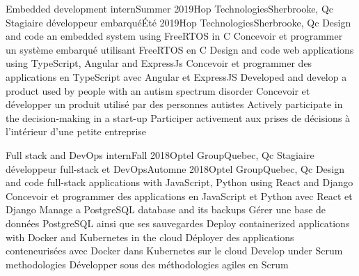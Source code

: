     \resumeSubheadingEnFr
      {Embedded development intern}{Summer 2019}{Hop Technologies}{Sherbrooke, Qc}
      {Stagiaire développeur embarqué}{Été 2019}{Hop Technologies}{Sherbrooke, Qc}
            \resumeItemListStart
                \resumeItemEnFr
                    {Design and code an embedded system using FreeRTOS in C}
                    {Concevoir et programmer un système embarqué utilisant FreeRTOS en C}
                \resumeItemEnFr
                    {Design and code web applications using TypeScript, Angular and ExpressJs}
                    {Concevoir et programmer des applications en TypeScript avec Angular et ExpressJS}
                \resumeItemEnFr
                    {Developed and develop a product used by people with an autism spectrum disorder}
                    {Concevoir et développer un produit utilisé par des personnes autistes}
                \resumeItemEnFr
                    {Actively participate in the decision-making in a start-up}
                    {Participer activement aux prises de décisions à l’intérieur d’une petite entreprise}
            \resumeItemListEnd

    \resumeSubheadingEnFr
      {Full stack and DevOps intern}{Fall 2018}{Optel Group}{Quebec, Qc}
      {Stagiaire développeur full-stack et DevOps}{Automne 2018}{Optel Group}{Quebec, Qc}
            \resumeItemListStart
                \resumeItemEnFr
                    {Design and code full-stack applications with JavaScript, Python using React and Django}
                    {Concevoir et programmer des applications en JavaScript et Python avec React et Django}
                \resumeItemEnFr
                    {Manage a PostgreSQL database and its backups}
                    {Gérer une base de données PostgreSQL ainsi que ses sauvegardes}
                \resumeItemEnFr
                    {Deploy containerized applications with Docker and Kubernetes in the cloud}
                    {Déployer des applications conteneurisées avec Docker dans Kubernetes sur le cloud}
                \resumeItemEnFr
                    {Develop under Scrum methodologies}
                    {Développer sous des méthodologies agiles en Scrum}
            \resumeItemListEnd
    \resumeSubHeadingListEnd


